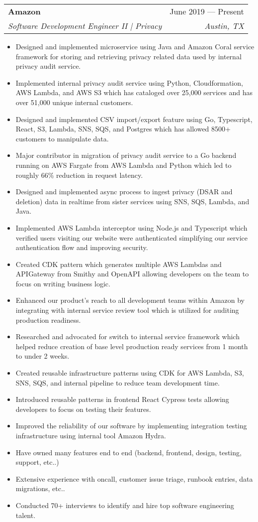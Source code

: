 \documentclass[letterpaper,11pt]{article}
\makeatletter
\newcommand{\resumeItem}[1]{
  \item\small{
    {#1 \vspace{-2pt}}
  }
}
\newcommand{\resumeSubheading}[4]{
  \vspace{-2pt}\item
    \begin{tabular*}{0.97\textwidth}[t]{l@{\extracolsep{\fill}}r}
      \textbf{#1} & #2 \\
      \textit{\small#3} & \textit{\small #4} \\
    \end{tabular*}\vspace{-7pt}
}
\newcommand{\resumeItemListStart}{\begin{itemize}}
\newcommand{\resumeItemListEnd}{\end{itemize}\vspace{-5pt}}
\makeatother
\begin{document}
    \resumeSubheading{Amazon}{June 2019 --- Present}{Software Development Engineer II | Privacy}{Austin, TX}
      \resumeItemListStart{}
        \resumeItem{Designed and implemented microservice using Java and Amazon Coral service framework for storing and retrieving privacy related data used by internal privacy audit service.}
        \resumeItem{Implemented internal privacy audit service using Python, Cloudformation, AWS Lambda, and AWS S3 which has cataloged over 25,000 services and has over 51,000 unique internal customers.}  
        \resumeItem{Designed and implemented CSV import/export feature using Go, Typescript, React, S3, Lambda, SNS, SQS, and Postgres which has allowed 8500+ customers to manipulate data.}
        \resumeItem{Major contributor in migration of privacy audit service to a Go backend running on AWS Fargate from AWS Lambda and Python which led to roughly 66\% reduction in request latency.}
        \resumeItem{Designed and implemented async process to ingest privacy (DSAR and deletion) data in realtime from sister services using SNS, SQS, Lambda, and Java.}
        \resumeItem{Implemented AWS Lambda interceptor using Node.js and Typescript which verified users visiting our website were authenticated simplifying our service authentication flow and improving security.}
        \resumeItem{Created CDK pattern which generates multiple AWS Lambdas and APIGateway from Smithy and OpenAPI allowing developers on the team to focus on writing business logic.}
        \resumeItem{Enhanced our product’s reach to all development teams within Amazon by integrating with internal service review tool which is utilized for auditing production readiness.}
        \resumeItem{Researched and advocated for switch to internal service framework which helped reduce creation of base level production ready services from 1 month to under 2 weeks.}
        \resumeItem{Created reusable infrastructure patterns using CDK for AWS Lambda, S3, SNS, SQS, and internal pipeline to reduce team development time.}
        \resumeItem{Introduced reusable patterns in frontend React Cypress tests allowing developers to focus on testing their features.}
        \resumeItem{Improved the reliability of our software by implementing integration testing infrastructure using internal tool Amazon Hydra.}
        \resumeItem{Have owned many features end to end (backend, frontend, design, testing, support, etc..)}
        \resumeItem{Extensive experience with oncall, customer issue triage, runbook entries, data migrations, etc..}
        \resumeItem{Conducted 70+ interviews to identify and hire top software engineering talent.}
      \resumeItemListEnd{}
      
\end{document}
